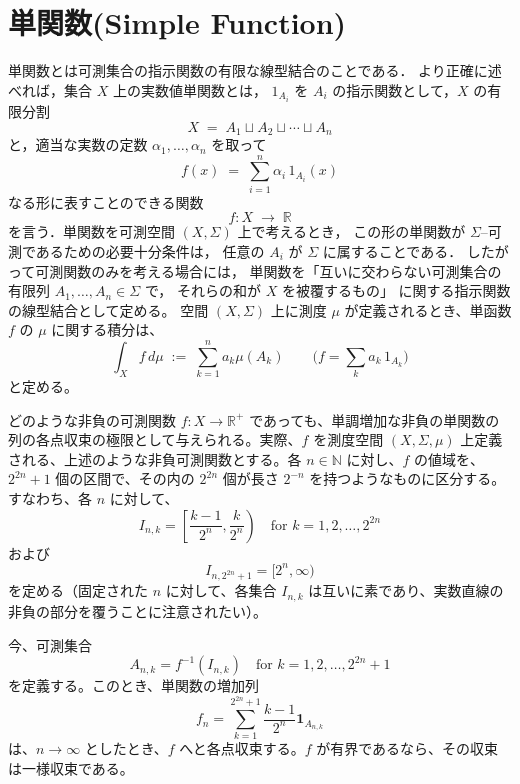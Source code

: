 \section{\\単関数(Simple Function)}

\begin{dfn}
  単関数とは可測集合の指示関数の有限な線型結合のことである．
  より正確に述べれば，集合 $X$ 上の実数値単関数とは，
  $1_{A_i}$ を $A_i$ の指示関数として，$X$ の有限分割
  \[
    X \;=\; A_1 \sqcup A_2 \sqcup \dotsb \sqcup A_n
  \]
  と，適当な実数の定数 $\alpha_1, \dots, \alpha_n$ を取って
  \[
    f(x) \;=\; \sum_{i=1}^{n} \alpha_i\, 1_{A_i}(x)
  \]
  なる形に表すことのできる関数 
  \[
    f \colon X \;\longrightarrow\; \mathbb{R}
  \]
  を言う．単関数を可測空間 $(X,\Sigma)$ 上で考えるとき，
  この形の単関数が $\Sigma$–可測であるための必要十分条件は，
  任意の $A_i$ が $\Sigma$ に属することである．
  したがって可測関数のみを考える場合には，
  単関数を「互いに交わらない可測集合の有限列
  $A_1,\dots,A_n \in \Sigma$ で，
  それらの和が $X$ を被覆するもの」
  に関する指示関数の線型結合として定める。
  空間 $(X,\Sigma)$ 上に測度 $\mu$ が定義されるとき、単函数 $f$ の $\mu$ に関する積分は、
\[
  \int_X f \, d\mu \;:=\; \sum_{k=1}^{n} a_k \mu(A_k)
  \qquad\bigl(f = \sum_{k} a_k\,1_{A_k}\bigr)
\]
と定める。
\end{dfn}%

\begin{lem}
  どのような非負の可測関数 $f: X \to \mathbb{R}^{+}$ であっても、単調増加な非負の単関数の列の各点収束の極限として与えられる。実際、$f$ を測度空間 $(X, \Sigma, \mu)$ 上定義される、上述のような非負可測関数とする。各 $n \in \mathbb{N}$ に対し、$f$ の値域を、$2^{2n} + 1$ 個の区間で、その内の $2^{2n}$ 個が長さ $2^{-n}$ を持つようなものに区分する。すなわち、各 $n$ に対して、
  \[
  I_{n,k} = \left[ \frac{k-1}{2^n}, \frac{k}{2^n} \right) \quad \text{for } k = 1, 2, \ldots, 2^{2n}
  \]
  および
  \[
  I_{n, 2^{2n}+1} = [2^n, \infty)
  \]
  を定める（固定された $n$ に対して、各集合 $I_{n,k}$ は互いに素であり、実数直線の非負の部分を覆うことに注意されたい）。
  
  今、可測集合
  \[
  A_{n,k} = f^{-1}(I_{n,k}) \quad \text{for } k = 1, 2, \ldots, 2^{2n} + 1
  \]
  を定義する。このとき、単関数の増加列
  \[
  f_n = \sum_{k=1}^{2^{2n}+1} \frac{k-1}{2^n} \mathbf{1}_{A_{n,k}}
  \]
  は、$n \to \infty$ としたとき、$f$ へと各点収束する。$f$ が有界であるなら、その収束は一様収束である。
  
\end{lem}
